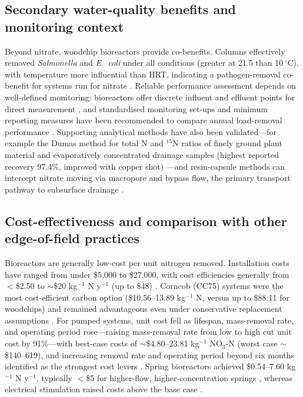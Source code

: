 \subsection{Secondary water-quality benefits and monitoring context}

Beyond nitrate, woodchip bioreactors provide co-benefits. Columns effectively removed \textit{Salmonella} and \textit{E.\ coli} under all conditions (greater at 21.5 than 10\,$^{\circ}$C), with temperature more influential than HRT, indicating a pathogen-removal co-benefit for systems run for nitrate \parencite{Soupir2018}. Reliable performance assessment depends on well-defined monitoring: bioreactors offer discrete influent and effluent points for direct measurement \parencite{Easton2019}, and standardised monitoring set-ups and minimum reporting measures have been recommended to compare annual load-removal performance \parencite{Christianson2021}. Supporting analytical methods have also been validated---for example the Dumas method for total N and $^{15}$N ratios of finely ground plant material and evaporatively concentrated drainage samples (highest reported recovery 97.4\%, improved with copper shot) \parencite{Schindler1999}---and resin-capsule methods can intercept nitrate moving via macropore and bypass flow, the primary transport pathway to subsurface drainage \parencite{Pampolino2000}.

\subsection{Cost-effectiveness and comparison with other edge-of-field practices}

Bioreactors are generally low-cost per unit nitrogen removed. Installation costs have ranged from under \$5,000 to \$27,000, with cost efficiencies generally from $<$\$2.50 to $\sim$\$20 kg$^{-1}$ N y$^{-1}$ (up to \$48) \parencite{Christianson2021}. Corncob (CC75) systems were the most cost-efficient carbon option (\$10.56--13.89 kg$^{-1}$ N, versus up to \$88.11 for woodchips) and remained advantageous even under conservative replacement assumptions \parencite{Law2023}. For pumped systems, unit cost fell as lifespan, mass-removal rate, and operating period rose---raising mass-removal rate from low to high cut unit cost by 91\%---with best-case costs of $\sim$\$4.80--23.81 kg$^{-1}$ NO$_3$-N (worst case $\sim$\$140--619), and increasing removal rate and operating period beyond six months identified as the strongest cost levers \parencite{Hartfiel2024}. Spring bioreactors achieved \$0.54--7.60 kg$^{-1}$ N y$^{-1}$, typically $<$\$5 for higher-flow, higher-concentration springs \parencite{Easton2019}, whereas electrical stimulation raised costs above the base case \parencite{Law2018}.

